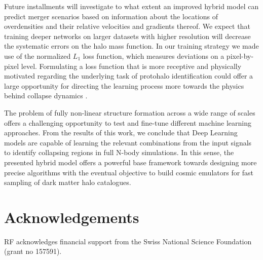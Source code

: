 \documentclass[fleqn,usenatbib]{mnras}
\begin{document}
Future installments will investigate to what extent an improved hybrid model can predict merger scenarios based on information about the locations of overdensities and their relative velocities and gradients thereof. We expect that training deeper networks on larger datasets with higher resolution will decrease the systematic errors on the halo mass function. In our training strategy we made use of the normalized $L_{1}$ loss function, which measures deviations on a pixel-by-pixel level. Formulating a loss function that is more receptive and physically motivated regarding the underlying task of protohalo identification could offer a large opportunity for directing the learning process more towards the physics behind collapse dynamics \cite[e.g.][]{Karpatne2017}.\par
The problem of fully non-linear structure formation across a wide range of scales offers a challenging opportunity to test and fine-tune different machine learning approaches. From the results of this work, we conclude that Deep Learning models are capable of learning the relevant combinations from the input signals to identify collapsing regions in full N-body simulations. In this sense, the presented hybrid model offers a powerful base framework towards designing more precise algorithms with the eventual objective to build cosmic emulators for fast sampling of dark matter halo catalogues.



\section*{Acknowledgements}
RF acknowledges financial support from the Swiss National Science Foundation (grant no 157591).
\newpage












\bsp	%
\label{lastpage}
\end{document}
